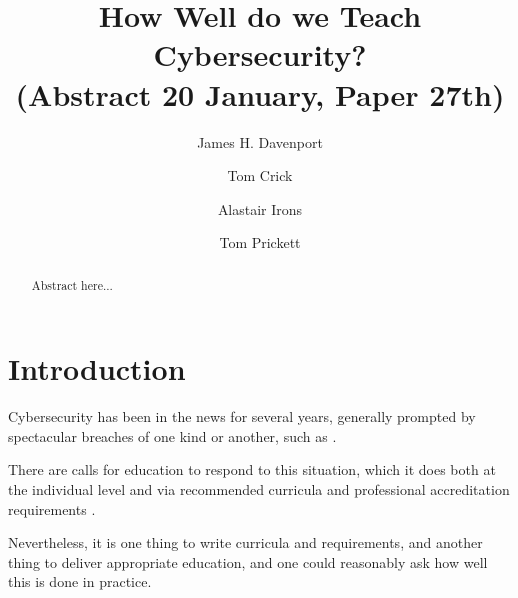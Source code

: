 \documentclass[sigconf]{acmart}
\begin{document}
\title{How Well do we Teach Cybersecurity?\\(Abstract 20 January, Paper 27th)}
\author{James H. Davenport}

\author{Tom Crick}

\author{Alastair Irons}
\orcid{}

\author{Tom Prickett}
\orcid{}

 


\begin{abstract}
Abstract here...
\end{abstract}



\maketitle


\section{Introduction}

Cybersecurity has been in the news for several years, generally prompted by spectacular breaches of one kind or another, such as \cite{BritishAirways2018a}.

There are calls for education to respond to this situation, which it does both at the individual level and via recommended curricula \cite{ACM2013a} and professional accreditation requirements \cite{BCS2018a}.

Nevertheless, it is one thing to write curricula and requirements, and
another thing to deliver appropriate education, and one could
reasonably ask how well this is done in practice.
\end{document}
